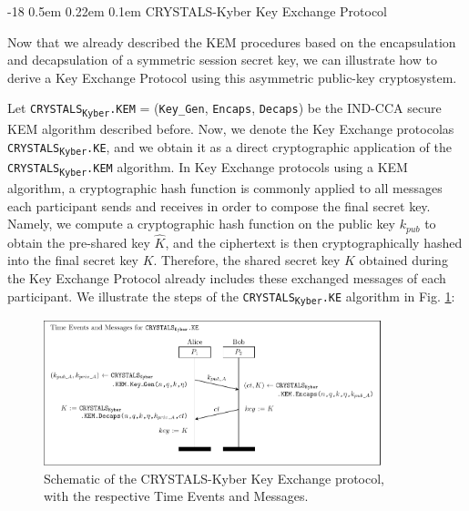 \documentclass[runningheads]{llncs}
\makeatletter
\renewcommand\subsubsection{\@startsection{subsubsection}{3}{\z@}%
                       {-18\p@ \@plus -4\p@ \@minus -4\p@}%
                       {0.5em \@plus 0.22em \@minus 0.1em}%
                       {\normalfont\normalsize\bfseries\boldmath}}
\numberwithin{equation}{section}
\makeatother
\begin{document}
    \subsubsection{CRYSTALS-Kyber Key Exchange Protocol}
    \label{subsubsec:crystals-kyber-key-exchange-protocol}

    Now that we already described the KEM procedures based on the encapsulation and decapsulation of a symmetric session secret key, we can illustrate how to derive a Key Exchange Protocol using this asymmetric public-key cryptosystem.

    \vspace{1ex}
    
    \noindent Let \texorpdfstring{\texttt{CRYSTALS}\textsubscript{\texttt{Kyber}}\texttt{.KEM} = \big(\texttt{Key\_Gen}, \texttt{Encaps}, \texttt{Decaps}\big)}\/ be the IND-CCA secure KEM algorithm described before. Now, we denote the Key Exchange protocol\break as \texorpdfstring{\texttt{CRYSTALS}\textsubscript{\texttt{Kyber}}\texttt{.KE}}\/, and we obtain it as a direct cryptographic application of the \texorpdfstring{\texttt{CRYSTALS}\textsubscript{\texttt{Kyber}}\texttt{.KEM}}\/ algorithm. In Key Exchange protocols using a KEM algorithm, a cryptographic hash function is commonly applied to all messages each participant sends and receives in order to compose the final secret key. Namely, we compute a cryptographic hash function on the public key ${k}_{pub}$ to obtain the pre-shared key $\hat{K}$, and the ciphertext is then cryptographically hashed into the final secret key $K$. Therefore, the shared secret key $K$ obtained during the Key Exchange Protocol already includes these exchanged messages of each participant. We illustrate the steps of the \texorpdfstring{\texttt{CRYSTALS}\textsubscript{\texttt{Kyber}}\texttt{.KE}}\/ algorithm in Fig. \ref{fig:crystals-kyber-key-exchange-protocol-schematic}:

    \vspace{-3.5ex}
    \begin{figure}[!ht]
        \centering
        \captionsetup{justification=centering}
        \includegraphics[width=0.8725\textwidth]{figures/sections/section-3/crystals-kyber-key-exchange-protocol-schematic.pdf}
        \caption{Schematic of the CRYSTALS-Kyber Key Exchange protocol,\\ with the respective Time Events and Messages.}
        \label{fig:crystals-kyber-key-exchange-protocol-schematic}
    \end{figure}
\end{document}
